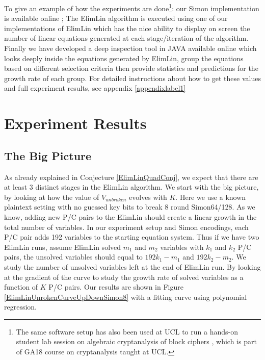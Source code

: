 To give an example of how the experiments are done\footnote{The same software setup has also been used at UCL to run a hands-on student lab session on algebraic cryptanalysis of block ciphers \cite{AlgteachElimLinLab}, which is part of GA18 course on cryptanalysis taught at UCL.}: our Simon implementation is available online  \cite{AlgteachElimLinLab,CourtoisSoftware}; The ElimLin algorithm is executed using one of our implementations of
ElimLin \cite{AlgteachElimLinLab,CourtoisSoftware} which has the nice ability to display on screen the number of linear equations generated at each stage/iteration of the algorithm. Finally we have developed a deep inspection tool in JAVA available online \cite{CourtoisSoftware} which looks deeply inside the equations generated by ElimLin, group the equations based on different selection criteria then provide statistics and predictions for the growth rate of each group. For detailed instructions about how to get these values and full experiment results, see appendix \ref{appendixlabel1}

\section{Experiment Results}
\subsection{The Big Picture}
\label{BigPictureUpAndDown}

As already explained in
Conjecture \ref{ElimLinQuadConj}, we expect that there are at least 3 distinct stages in the ElimLin algorithm.
We start with the big picture, by looking at how the value of $V_{unbroken}$ evolves with $K$. Here we use a known plaintext setting with no guessed key bits to break 8 round Simon64/128. As we know, adding new P/C pairs to the ElimLin should create a linear growth in the total number of variables. In our experiment setup and Simon encodings, each P/C pair adds 192 variables to the starting equation system. Thus if we have two ElimLin runs, assume ElimLin solved $m_1$ and $m_2$ variables with $k_1$ and $k_2$ P/C pairs, the unsolved variables should equal to $192 k_1 - m_1 $ and $192 k_2 - m_2$.  We study the number of unsolved variables left at the end of ElimLin run. By looking at the gradient of the curve to study the growth rate of solved variables as a function of $K$ P/C pairs. Our results are shown in Figure \ref{ElimLinUnrokenCurveUpDownSimon8} with a fitting curve using polynomial regression.

